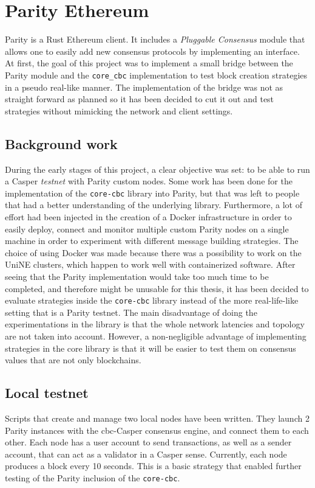 \section{Parity Ethereum}
Parity is a Rust Ethereum client. It includes a \textit{Pluggable Consensus}
module that allows one to easily add new consensus protocols by implementing an
interface.  At first, the goal of this project was to implement a small bridge
between the Parity module and the \texttt{core\_cbc} implementation to test block creation
strategies in a pseudo real-like manner. The implementation of the bridge was
not as straight forward as planned so it has been decided to cut it out and test
strategies without mimicking the network and client settings.

\subsection{Background work}
During the early stages of this project, a clear objective was set: to be able
to run a Casper \textit{testnet} with Parity custom nodes. Some work has been
done for the implementation of the \texttt{core-cbc} library into Parity, but
that was left to people that had a better understanding of the underlying
library. Furthermore,  a lot of effort had been
injected in the creation of a Docker infrastructure in order to easily deploy,
connect and monitor multiple custom Parity nodes on a single machine in order to
experiment with different message building strategies. The choice of using
Docker was made because there was a  possibility to work on the UniNE clusters,
which happen to work well with containerized software. After seeing that the
Parity implementation would take too much time to be completed, and therefore
might be unusable for this thesis, it has been decided to evaluate strategies
inside the \texttt{core-cbc} library instead of the more real-life-like setting
that is a Parity testnet. The main disadvantage of doing the experimentations in
the library is that the whole network latencies and topology are not taken into
account. However, a non-negligible advantage of implementing strategies in the
core library is that it will be easier to test them on consensus values that are
not only blockchains.  

\subsection{Local testnet}
Scripts that create and manage two local nodes have been written. They launch 2
Parity instances with the \gls{cbc}-Casper consensus engine, and connect them
to each other. Each node has a user account to send transactions, as well as a
sender account, that can act as a validator in a Casper sense. Currently, each
node produces a block every 10 seconds. This is a basic strategy that enabled
further testing of the Parity inclusion of the \texttt{core-cbc}.

